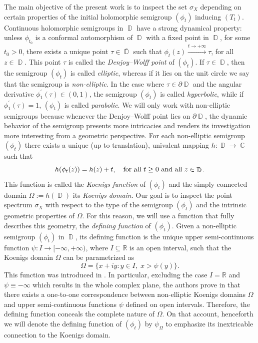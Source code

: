 \documentclass[11pt]{amsart}
\numberwithin{equation}{section}
\theoremstyle{definition}
\DeclareMathOperator{\C}{\mathbb{C}}
\DeclareMathOperator{\D}{\mathbb{D}}
\begin{document}
	The main objective of the present work is to inspect the set $\sigma_X$ depending on certain properties of the initial holomorphic semigroup $(\phi_t)$ inducing $(T_t)$. Continuous holomorphic semigroups in $\D$ have a strong dynamical property: unless $\phi_{t_0}$ is a conformal automorphism of $\D$ with a fixed point in $\D$, for some $t_0>0$, there exists a unique point $\tau \in \overline{\D}$ such that $\phi_t(z)\xrightarrow{t\to+\infty}\tau$, for all $z\in\D$. This point $\tau$ is called the \textit{Denjoy--Wolff point} of $(\phi_t)$. If $\tau \in \D$, then the semigroup $(\phi_t)$ is called \textit{elliptic}, whereas if it lies on the unit circle we say that the semigroup is \textit{non-elliptic}. In the case where $\tau \in \partial \D$ and the angular derivative $\phi_1^{\prime}(\tau)\in(0,1)$, the semigroup $(\phi_t)$ is called \textit{hyperbolic}, while if $\phi_1^{\prime}(\tau)=1$, $(\phi_t)$ is called \textit{parabolic}. We will only work with non-elliptic semigroups because whenever the Denjoy--Wolff point lies on $\partial\D$, the dynamic behavior of the semigroup presents more intricacies and renders its investigation more interesting from a geometric perspective. For each non-elliptic semigroup $(\phi_t)$ there exists a unique (up to translation), univalent mapping $h:\D\to\C$ such that
	\begin{equation}\label{eq:koenigs}
		h(\phi_t(z))=h(z)+t, \quad \textup{for all }t\ge0\textup{ and all }z\in\D.
	\end{equation}
	This function is called the \textit{Koenigs function} of $(\phi_t)$ and the simply connected domain $\Omega:=h(\D)$ its \textit{Koenigs domain}. Our goal is to inspect the point spectrum $\sigma_X$ with respect to the type of the semigroup $(\phi_t)$ and the intrinsic geometric properties of $\Omega$. For this reason, we will use a function that fully describes this geometry, the \textit{defining function} of $(\phi_t)$. Given a non-elliptic semigroup $(\phi_t)$ in $\D$, its defining function is the unique upper semi-continuous function $\psi:I\to [-\infty,+\infty)$, where $I\subseteq\mathbb{R}$ is an open interval, such that the Koenigs domain $\Omega$ can be parametrized as 
	\begin{equation}\label{eq:defining function}
		\Omega=\{x+iy:y\in I, \; x>\psi(y)\}.
	\end{equation}
	This function was introduced in \cite[Definition 2.3]{BGGY}. In particular, excluding the case $I=\mathbb{R}$ and $\psi\equiv -\infty$ which results in the whole complex plane, the authors prove in \cite[Proposition 2.2]{BGGY} that there exists a one-to-one correspondence between non-elliptic Koenigs domains $\Omega$ and upper semi-continuous functions $\psi$ defined on open intervals. Therefore, the defining function conceals the complete nature of $\Omega$. On that account, henceforth we will denote the defining function of $(\phi_t)$ by $\psi_\Omega$ to emphasize its inextricable connection to the Koenigs domain.
	
\end{document}
